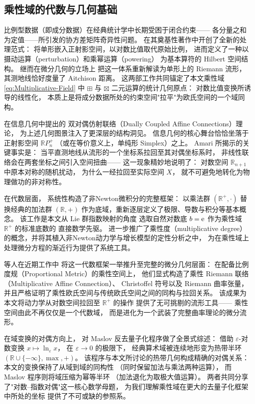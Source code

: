 ﻿\documentclass[10pt,a4paper]{article}
\numberwithin{equation}{section}
\newcommand{\sqplus}{\mathbin{\boxplus}}
\newcommand{\sqtimes}{\mathbin{\boxtimes}}
\begin{document}
\subsection{乘性域的代数与几何基础}

比例型数据（即成分数据）在经典统计学中长期受困于闭合约束——
各分量之和为定值——所引发的协方差矩阵奇异性问题。
\textcite{Aitchison1986} 在其奠基性著作中开创了全新的处理范式：
将单形嵌入正射影空间，以对数比值取代原始比例，
进而定义了一种以摄动运算（perturbation）和乘幂运算（powering）
为基本算符的 Hilbert 空间结构。
\textcite{PawlowskyGlahnEgozcue2001} 继而在微分几何的立场上
把这一体系重新解读为单形上的 Riemann 流形，
其测地线恰好度量了 Aitchison 距离。
这两部工作共同锚定了本文乘性域 \eqref{eq:Multiplicative-Field} 中
$\sqplus$ 与 $\sqtimes$ 二元运算的统计几何原点：
对数比值变换所诱导的线性化，
本质上是将成分数据所处的约束空间"拉平"为欧氏空间的一个域同构。

\textcite{Amari2016} 在信息几何中提出的
双对偶仿射联络（Dually Coupled Affine Connections）理论，
为上述几何图景注入了更深层的结构洞见。
信息几何的核心舞台恰恰坐落于正射影空间 $\mathbb R P^+_n$
（或在等价意义上，单纯形 Simplex）之上。
Amari 所揭示的关键事实是：
当平直测地线从流形的一个坐标系拉回至其对偶坐标系时，
非线性联络会在两套坐标之间引入空间扭曲——
这一现象精妙地说明了：
对数空间 $\mathbb R_{n+1}$ 中原本对称的随机扰动，
为什么一经拉回至实际空间 $X$，
就不可避免地转化为物理做功的非对称性。

在代数层面，\textcite{GrossmanKatz1972} 系统性构造了非Newton微积分的完整框架：
以乘法群 $(\mathbb R^+,\cdot)$ 替换经典的加法群 $(\mathbb R,+)$
作为底域，重新逐层定义了极限、导数与积分等基本概念。
该工作是本文从 Lie 群指数映射的角度
选取自然对数底 $b=\text e$ 作为乘性域 $\boxed{\mathbb R^+}$ 的标准底数的
直接数学先驱。
\textcite{CordovaLepe2006} 进一步推广了乘性度（multiplicative degree）
的概念，并将其植入非Newton动力学与增长模型的定性分析之中，
为在乘性域上处理微分方程的渐近行为提供了系统工具。

\textcite{Has2026} 等人在近期工作中
将这一代数框架一举推升至完整的微分几何层面：
在配备比例度规（Proportional Metric）的乘性空间上，
他们显式构造了乘性 Riemann 联络（Multiplicative Affine Connection）、
Christoffel 符号以及 Riemann 曲率张量，
并且严格证明了乘性欧氏空间与传统欧氏空间之间的同构与拉回关系。
该成果为本文将动力学从对数空间拉回至 $\mathbb R^+$ 的操作
提供了无可挑剔的流形工具——
乘性空间由此不再仅仅是一个代数域，
而是进化为一个武装了完整曲率理论的微分流形。

在域变换的对偶方向上，\textcite{Litvinov2007} 对 Maslov 反去量子化程序做了全景式综述：
借助 $\varepsilon$-对数变换 $x \mapsto \ln_{\varepsilon} x$，
在 $\varepsilon \to 0$ 的极限下，
经典算术域被连续地形变为热带半环
$(\mathbb R \cup \{-\infty\}, \max, +)$。
该程序与本文所讨论的热带几何构成精确的对偶关系：
本文的变换保持了从域到域的同构性
（同时保留加法与乘法两种运算），
而 Maslov 程序则将域压缩为幂等半环
（加法退化为取极大值运算）。
两者共同分享了"对数--指数对偶"这一核心数学母题，
为我们理解乘性域在更大的去量子化框架中所处的坐标
提供了不可或缺的参照系。
\end{document}
